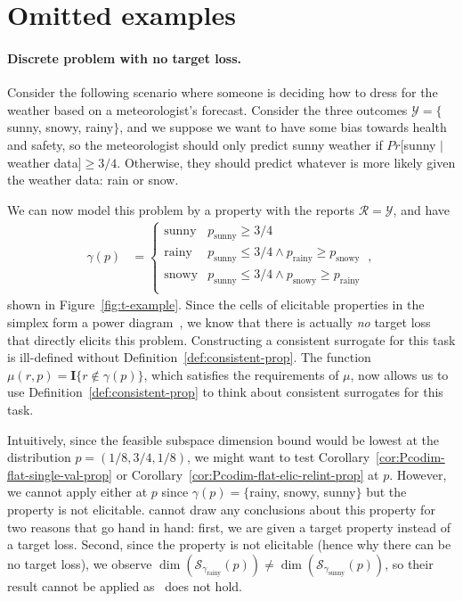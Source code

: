 \documentclass[anon,12pt]{colt2021} %
\newcommand{\propdis}{\mu}
\newcommand{\R}{\mathcal{R}}
\newcommand{\Sc}{\mathcal{S}}  %
\newcommand{\Y}{\mathcal{Y}}
\newcommand{\Ind}[1]{\mathbf{I}\{{#1}\}}
\begin{document}
\section{Omitted examples}\label{app:omitted-examples}
\paragraph{Discrete problem with no target loss.}
Consider the following scenario where someone is deciding how to dress for the weather based on a meteorologist's forecast.
Consider the three outcomes $\Y = \{$sunny, snowy, rainy$\}$, and we suppose we want to have some bias towards health and safety, so the meteorologist should only predict sunny weather if $Pr[$sunny $|$ weather data$] \geq 3/4$.
Otherwise, they should predict whatever is more likely  given the weather data: rain or snow.

We can now model this problem by a property with the reports $\R = \Y$, and have 
\begin{align*}
\gamma(p) &= \begin{cases}
\text{sunny} & p_{\text{sunny}} \geq 3/4 \\
\text{rainy} & p_{\text{sunny}} \leq 3/4 \wedge p_{\text{rainy}} \geq p_{\text{snowy}} \\
\text{snowy} & p_{\text{sunny}} \leq 3/4 \wedge p_{\text{snowy}} \geq p_{\text{rainy}} \\
\end{cases}~,~
\end{align*} 
shown in Figure~\ref{fig:t-example}.
Since the cells of elicitable properties in the simplex form a power diagram~\citep{lambert2009eliciting}, we know that there is actually \emph{no} target loss that directly elicits this problem.
Constructing a consistent surrogate for this task is ill-defined without Definition~\ref{def:consistent-prop}.
The function $\propdis(r,p) = \Ind{r \not \in \gamma(p)}$, which satisfies the requirements of $\propdis$, now allows us to use Definition~\ref{def:consistent-prop} to think about consistent surrogates for this task.

Intuitively, since the feasible subspace dimension bound would be lowest at the distribution $p = (1/8, 3/4,1/8)$, we might want to test Corollary~\ref{cor:Pcodim-flat-single-val-prop} or Corollary~\ref{cor:Pcodim-flat-elic-relint-prop} at $p$.
However, we cannot apply either at $p$ since $\gamma(p) = \{$rainy, snowy, sunny$\}$ but the property is not elicitable.
\citet[Theorem 16]{ramaswamy2016convex} cannot draw any conclusions about this property for two reasons that go hand in hand: first, we are given a target property instead of a target loss.
Second, since the property is not elicitable (hence why there can be no target loss), we observe $\dim(\Sc_{\gamma_{\text{rainy}}}(p)) \neq \dim(\Sc_{\gamma_{\text{sunny}}}(p))$, so their result cannot be applied as~\citet[Lemma 23]{ramaswamy2016convex} does not hold.
\end{document}
